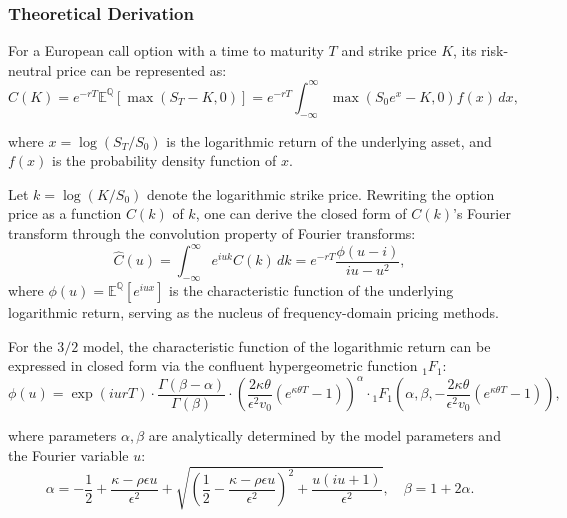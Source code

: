 \subsubsection{Theoretical Derivation}

For a European call option with a time to maturity $T$ and strike price $K$, its risk-neutral price can be represented as:
\begin{equation}
C(K) = e^{-rT} \mathbb{E}^{\mathbb{Q}} \left[ \max(S_T - K, 0) \right] = e^{-rT} \int_{-\infty}^{\infty} \max(S_0 e^x - K, 0) f(x) \, dx,
\end{equation}

where $x = \log(S_T/S_0)$ is the logarithmic return of the underlying asset, and $f(x)$ is the probability density function of $x$.

Let $k = \log(K/S_0)$ denote the logarithmic strike price. Rewriting the option price as a function $C(k)$ of $k$, one can derive the closed form of $C(k)$'s Fourier transform through the convolution property of Fourier transforms:
\begin{equation}
  \hat{C}(u) = \int_{-\infty}^{\infty} e^{iuk} C(k) \, dk = e^{-rT} \frac{\phi(u - i)}{iu - u^2},
\end{equation}
where $\phi(u) = \mathbb{E}^{\mathbb{Q}} \left[ e^{iux} \right]$ is the characteristic function of the underlying logarithmic return, serving as the nucleus of frequency-domain pricing methods.

For the $3/2$ model, the characteristic function of the logarithmic return can be expressed in closed form via the confluent hypergeometric function $_1F_1$:
\begin{equation}
\phi(u) = \exp\left( i u r T \right) \cdot \frac{\Gamma(\beta - \alpha)}{\Gamma(\beta)} \cdot \left( \frac{2 \kappa \theta}{\epsilon^2 v_0} \left( e^{\kappa \theta T} - 1 \right) \right)^{\alpha} \cdot {}_1F_1 \left( \alpha, \beta, -\frac{2 \kappa \theta}{\epsilon^2 v_0} \left( e^{\kappa \theta T} - 1 \right) \right),
\end{equation}

where parameters $\alpha, \beta$ are analytically determined by the model parameters and the Fourier variable $u$:
\begin{equation}
\alpha = -\frac{1}{2} + \frac{\kappa - \rho \epsilon u}{\epsilon^2} + \sqrt{\left( \frac{1}{2} - \frac{\kappa - \rho \epsilon u}{\epsilon^2} \right)^2 + \frac{u(iu + 1)}{\epsilon^2}}, \quad \beta = 1 + 2\alpha.
\end{equation}


